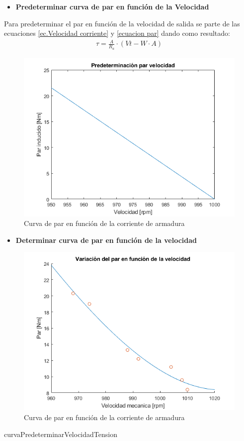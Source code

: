 \documentclass[11pt,letterpaper]{article}     %
\begin{document}
	\begin{itemize}
	\item \textbf{Predeterminar curva de par en función de la Velocidad}
	\end{itemize}
	Para predeterminar el par en función de la velocidad de salida se parte de las ecuaciones \ref{ec.Velocidad corriente} y \ref{ecuacion par} dando como resultado:
	\begin{eqnarray}
		\tau = \frac{A}{R_a}\cdot (Vt- W \cdot A)
	\end{eqnarray}
	
	\begin{figure}[H]
		\centering
		\includegraphics[scale=0.8]{./recursos-Lab6/curvaPredeterminarParVelocidad.png}
		\caption{Curva de par en función de la corriente de armadura}
		\label{fig:CurvapredeterminadaDeParVelocidad}
	\end{figure}
	\begin{itemize}
	\item \textbf{Determinar curva de par en función de la velocidad}
	\end{itemize}
	\begin{figure}[H]
	\centering
	\includegraphics[scale=0.8]{./recursos-Lab6/curvaParVelocidad.png}
	\caption{Curva de par en función de la corriente de armadura}
	\label{fig:CurvaDeParVelocidad}
\end{figure}
curvaPredeterminarVelocidadTension
\end{document}
